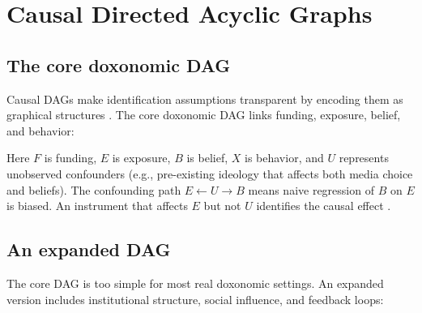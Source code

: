\section{Causal Directed Acyclic Graphs}
\label{sec:ch16-dags}

\subsection{The core doxonomic DAG}

Causal DAGs make identification assumptions transparent by encoding them as graphical structures \autocite{pearl2009}.
The core doxonomic DAG links funding, exposure, belief, and behavior:

\begin{center}
\end{center}

Here $F$ is funding, $E$ is exposure, $B$ is belief, $X$ is behavior, and $U$ represents unobserved confounders (e.g., pre-existing ideology that affects both media choice and beliefs).
The confounding path $E \leftarrow U \to B$ means naive regression of $B$ on $E$ is biased.
An instrument that affects $E$ but not $U$ identifies the causal effect \autocite{pearl2009, angrist2009}.

\subsection{An expanded DAG}

The core DAG is too simple for most real doxonomic settings.
An expanded version includes institutional structure, social influence, and feedback loops:

